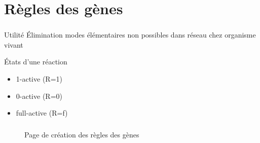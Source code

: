 \documentclass{beamer}
\begin{document}
\section{Règles des gènes}

\begin{frame}
	\frametitle{\hspace{1cm}\textcolor{bleu2}{\secname}}
	\begin{center}
		\begin{minipage}[c]{0.9\textwidth}
			\begin{block}{\hspace{0.2cm}Utilité}
				Élimination modes élémentaires non possibles dans réseau chez organisme vivant
			\end{block}
			\begin{block}{\hspace{0.2cm}États d'une réaction}
				\begin{itemize}
					\item 1-active (R=1)
					\item 0-active (R=0)
					\item full-active (R=f)
				\end{itemize}
			\end{block}
		\end{minipage}
	\end{center}
\end{frame}

\begin{frame}
	\frametitle{\hspace{1cm}\textcolor{bleu2}{\secname}}
	\begin{figure}[!ht]
		\begin{center}
			\caption{Page de création des règles des gènes}
  		\end{center}	
	\end{figure}
\end{frame}
\end{document}
